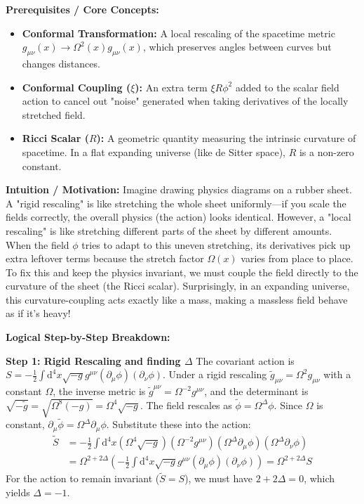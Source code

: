\begin{solution}
\textbf{Prerequisites / Core Concepts:}
\begin{itemize}
    \item \textbf{Conformal Transformation:} A local rescaling of the spacetime metric $g_{\mu\nu}(x) \to \Omega^2(x) g_{\mu\nu}(x)$, which preserves angles between curves but changes distances.
    \item \textbf{Conformal Coupling ($\xi$):} An extra term $\xi R \phi^2$ added to the scalar field action to cancel out "noise" generated when taking derivatives of the locally stretched field.
    \item \textbf{Ricci Scalar ($R$):} A geometric quantity measuring the intrinsic curvature of spacetime. In a flat expanding universe (like de Sitter space), $R$ is a non-zero constant.
\end{itemize}

\textbf{Intuition / Motivation:}
Imagine drawing physics diagrams on a rubber sheet. A "rigid rescaling" is like stretching the whole sheet uniformly—if you scale the fields correctly, the overall physics (the action) looks identical. However, a "local rescaling" is like stretching different parts of the sheet by different amounts. When the field $\phi$ tries to adapt to this uneven stretching, its derivatives pick up extra leftover terms because the stretch factor $\Omega(x)$ varies from place to place. To fix this and keep the physics invariant, we must couple the field directly to the curvature of the sheet (the Ricci scalar). Surprisingly, in an expanding universe, this curvature-coupling acts exactly like a mass, making a massless field behave as if it's heavy!

\textbf{Logical Step-by-Step Breakdown:}

\textbf{Step 1: Rigid Rescaling and finding $\Delta$}
The covariant action is $S = - \frac{1}{2} \int \mathrm{d}^4 x \sqrt{-g} g^{\mu\nu} (\partial_\mu \phi) (\partial_\nu \phi)$.
Under a rigid rescaling $\tilde{g}_{\mu\nu} = \Omega^2 g_{\mu\nu}$ with a constant $\Omega$, the inverse metric is $\tilde{g}^{\mu\nu} = \Omega^{-2} g^{\mu\nu}$, and the determinant is $\sqrt{-\tilde{g}} = \sqrt{\Omega^8 (-g)} = \Omega^4 \sqrt{-g}$.
The field rescales as $\tilde{\phi} = \Omega^\Delta \phi$. Since $\Omega$ is constant, $\partial_\mu \tilde{\phi} = \Omega^\Delta \partial_\mu \phi$.
Substitute these into the action:
\[ \begin{aligned}
    \tilde{S} &= - \frac{1}{2} \int \mathrm{d}^4 x (\Omega^4 \sqrt{-g}) (\Omega^{-2} g^{\mu\nu}) (\Omega^\Delta \partial_\mu \phi) (\Omega^\Delta \partial_\nu \phi) \\
              &= \Omega^{2 + 2\Delta} \left( - \frac{1}{2} \int \mathrm{d}^4 x \sqrt{-g} g^{\mu\nu} (\partial_\mu \phi) (\partial_\nu \phi) \right) = \Omega^{2 + 2\Delta} S
\end{aligned} \]
For the action to remain invariant ($\tilde{S} = S$), we must have $2 + 2\Delta = 0$, which yields $\Delta = -1$.


\end{solution}
